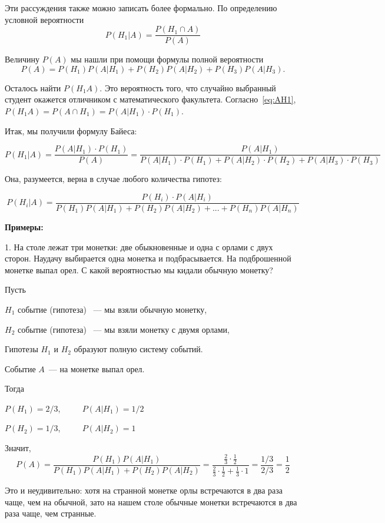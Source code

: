 \documentclass[11pt]{article}
\begin{document}
\vspace{1em}
{\footnotesize Эти рассуждения также можно записать более формально. По определению условной вероятности	$$P(H_{1}|A)=\frac{P(H_{1}\cap A)}{P(A)}$$

Величину $P(A)$ мы нашли при помощи формулы полной вероятности 
$$P(A)=P(H_{1})P(A|H_{1})+P(H_{2})P(A|H_{2})+P(H_{3})P(A|H_{3}).$$

Осталось найти $P(H_{1}A)$. Это вероятность того, что случайно выбранный студент окажется отличником с математического факультета. Согласно~\eqref{eq:AH1}, $P(H_{1}A)=P(A\cap H_1)=P(A|H_{1})\cdot P(H_{1})$.

Итак, мы получили формулу Байеса:

\begin{equation*}
	P(H_1|A)=\frac{P(A|H_1)\cdot P(H_1)}{P(A)} = \frac{P(A|H_1)}{P(A|H_1)\cdot
	P(H_1)+P(A|H_2)\cdot P(H_2)+P(A|H_3)\cdot P(H_3)}
\end{equation*}

Она, разумеется, верна в случае любого количества гипотез:
	
\begin{equation}
	P(H_{i}|A)=\frac{P(H_{i})\cdot P(A|H_{i})}{P(H_{1})P(A|H_{1})+P(H_{2})P(A|H_{2})+...+P(H_{n})P(A|H_{n})}
\end{equation}
}
\textbf{Примеры:}

1. На столе лежат три монетки: две обыкновенные и одна с орлами с двух сторон. Наудачу выбирается одна монетка и подбрасывается. На подброшенной монетке выпал орел. С какой вероятностью мы кидали обычную монетку?

Пусть

$H_{1}$ событие (гипотеза) ~--- мы взяли обычную монетку,

$H_{2}$ событие (гипотеза) ~--- мы взяли монетку с двумя орлами,

Гипотезы $H_{1}$ и $H_{2}$ образуют полную систему событий.

Событие $A$~--- на монетке выпал орел.

Тогда
	
$P(H_{1})=2/3$, ~~~~
$P(A|H_{1})=1/2$

$P(H_{2})=1/3$, ~~~~
$P(A|H_{2})=1$

Значит,	$$P(A)=\frac{P(H_{1})P(A|H_{1})}{P(H_{1})P(A|H_{1})+P(H_{2})P(A|H_{2})}=\frac{\frac{2}{3}\cdot\frac{1}{2}}{\frac{2}{3}\cdot\frac{1}{2}+\frac{1}{3}\cdot1}=\frac{1/3}{2/3}=\frac{1}{2}$$

Это и неудивительно: хотя на странной монетке орлы встречаются в два раза чаще, чем на обычной, зато на нашем столе обычные монетки встречаются в два раза чаще, чем странные.
\end{document}
